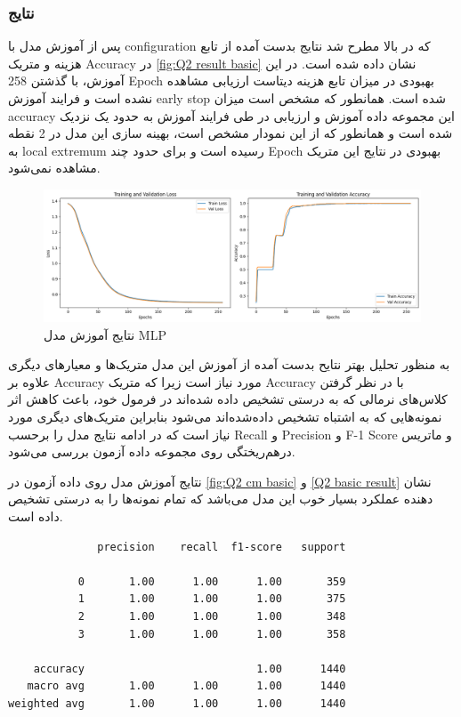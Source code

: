 \documentclass{article}
\begin{document}
\subsubsection{نتایج}
پس از آموزش مدل با 
configuration 
که در بالا مطرح شد نتایج بدست آمده از تابع هزینه و متریک 
Accuracy
در 
\autoref{fig:Q2 result basic}
نشان داده شده است. در این آموزش، با گذشتن 258 
Epoch
بهبودی در میزان تابع هزینه دیتاست ارزیابی مشاهده نشده است و فرایند آموزش
early stop 
شده است. همانطور که مشخص است میزان accuracy این مجموعه داده آموزش و ارزیابی در طی فرایند آموزش به حدود یک نزدیک شده است و همانطور که از این نمودار مشخص است، بهینه سازی این مدل در 2 نقطه به 
local extremum 
رسیده است و برای حدود چند 
Epoch
بهبودی در نتایج این متریک مشاهده نمی‌شود. 
\begin{figure}[H]
\centering
\includegraphics[width=1\linewidth]{"img/Q2/result basic"}
\caption{نتایج آموزش مدل MLP}
\label{fig:Q2 result basic}
\end{figure}

به منظور تحلیل بهتر نتایح بدست آمده از آموزش این مدل متریک‌ها و معیارهای دیگری علاوه بر 
Accuracy 
مورد نیاز است زیرا که متریک 
Accuracy 
با در نظر گرفتن کلاس‌های نرمالی که به درستی تشخیص داده شده‌اند در فرمول خود، باعث کاهش اثر نمونه‌هایی که به اشتباه تشخیص داده‌شده‌اند می‌شود بنابراین متریک‌های دیگری مورد نیاز است که در ادامه نتایج مدل را برحسب 
Recall و Precision و F-1 Score
و ماتریس درهم‌ریختگی روی مجموعه داده آزمون بررسی می‌شود.

نتایج آموزش مدل روی داده آزمون در 
\autoref{fig:Q2 cm basic}
و
\autoref{Q2 basic result}
نشان دهنده عملکرد بسیار خوب این مدل می‌باشد که تمام نمونه‌ها را به درستی تشخیص داده است.
 
\begin{LTR}
\label{Q2 basic result}
\begin{verbatim}
              precision    recall  f1-score   support

           0       1.00      1.00      1.00       359
           1       1.00      1.00      1.00       375
           2       1.00      1.00      1.00       348
           3       1.00      1.00      1.00       358

    accuracy                           1.00      1440
   macro avg       1.00      1.00      1.00      1440
weighted avg       1.00      1.00      1.00      1440
\end{verbatim}
\end{LTR}
\end{document}
